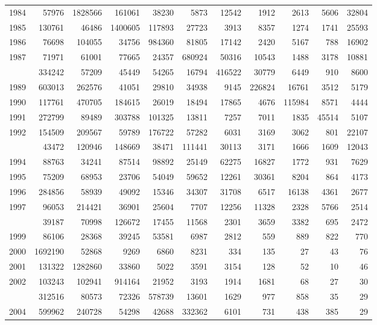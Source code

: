 \documentclass[
]{article}
\begin{document}
\begin{longtable}[t]{lrrrrrrrrrr}
1984 & 57976 & 1828566 & 161061 & 38230 & 5873 & 12542 & 1912 & 2613 & 5606 & 32804\\
1985 & 130761 & 46486 & 1400605 & 117893 & 27723 & 3913 & 8357 & 1274 & 1741 & 25593\\
1986 & 76698 & 104055 & 34756 & 984360 & 81805 & 17142 & 2420 & 5167 & 788 & 16902\\
1987 & 71971 & 61001 & 77665 & 24357 & 680924 & 50316 & 10543 & 1488 & 3178 & 10881\\
\addlinespace
1988 & 334242 & 57209 & 45449 & 54265 & 16794 & 416522 & 30779 & 6449 & 910 & 8600\\
1989 & 603013 & 262576 & 41051 & 29810 & 34938 & 9145 & 226824 & 16761 & 3512 & 5179\\
1990 & 117761 & 470705 & 184615 & 26019 & 18494 & 17865 & 4676 & 115984 & 8571 & 4444\\
1991 & 272799 & 89489 & 303788 & 101325 & 13811 & 7257 & 7011 & 1835 & 45514 & 5107\\
1992 & 154509 & 209567 & 59789 & 176722 & 57282 & 6031 & 3169 & 3062 & 801 & 22107\\
\addlinespace
1993 & 43472 & 120946 & 148669 & 38471 & 111441 & 30113 & 3171 & 1666 & 1609 & 12043\\
1994 & 88763 & 34241 & 87514 & 98892 & 25149 & 62275 & 16827 & 1772 & 931 & 7629\\
1995 & 75209 & 68953 & 23706 & 54049 & 59652 & 12261 & 30361 & 8204 & 864 & 4173\\
1996 & 284856 & 58939 & 49092 & 15346 & 34307 & 31708 & 6517 & 16138 & 4361 & 2677\\
1997 & 96053 & 214421 & 36901 & 25604 & 7707 & 12256 & 11328 & 2328 & 5766 & 2514\\
\addlinespace
1998 & 39187 & 70998 & 126672 & 17455 & 11568 & 2301 & 3659 & 3382 & 695 & 2472\\
1999 & 86106 & 28368 & 39245 & 53581 & 6987 & 2812 & 559 & 889 & 822 & 770\\
2000 & 1692190 & 52868 & 9269 & 6860 & 8231 & 334 & 135 & 27 & 43 & 76\\
2001 & 131322 & 1282860 & 33860 & 5022 & 3591 & 3154 & 128 & 52 & 10 & 46\\
2002 & 103243 & 102941 & 914164 & 21952 & 3193 & 1914 & 1681 & 68 & 27 & 30\\
\addlinespace
2003 & 312516 & 80573 & 72326 & 578739 & 13601 & 1629 & 977 & 858 & 35 & 29\\
2004 & 599962 & 240728 & 54298 & 42688 & 332362 & 6101 & 731 & 438 & 385 & 29\\

\end{longtable}
\end{document}

